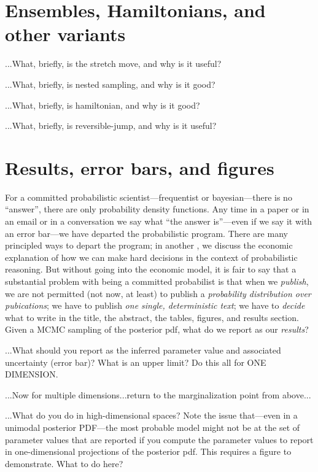 \documentclass[12pt,twoside,pdftex]{article}
\begin{document}
\section{Ensembles, Hamiltonians, and other variants}


...What, briefly, is the stretch move, and why is it useful?

...What, briefly, is nested sampling, and why is it good?

...What, briefly, is hamiltonian, and why is it good?

...What, briefly, is reversible-jump, and why is it useful?

\section{Results, error bars, and figures}

For a committed probabilistic scientist---frequentist or
bayesian---there is no ``answer'', there are only probability density
functions.  Any time in a paper or in an email or in a conversation
we say what ``the answer is''---even if we say it with an error
bar---we have departed the probabilistic program.  There are many
principled ways to depart the program; in another \documentname, we
discuss the economic explanation of how we can make hard decisions in
the context of probabilistic reasoning.
But without going into the economic model, it is fair to say that a
substantial problem with being a committed probabilist is that when we
\emph{publish}, we are not permitted (not now, at least) to publish a
\emph{probability distribution over pubications}; we have to publish
\emph{one single, deterministic text}; we have to \emph{decide} what
to write in the title, the abstract, the tables, figures, and results
section.  Given a MCMC sampling of the posterior pdf, what do we
report as our \emph{results}?

...What should you report as the inferred parameter value and
associated uncertainty (error bar)?  What is an upper limit?  Do this
all for ONE DIMENSION.

...Now for multiple dimensions...return to the marginalization point
from above...

...What do you do in high-dimensional spaces?  Note the issue
that---even in a unimodal posterior PDF---the most probable model
might not be at the set of parameter values that are reported if you
compute the parameter values to report in one-dimensional projections
of the posterior pdf.  This requires a figure to demonstrate.  What to
do here?
\end{document}
